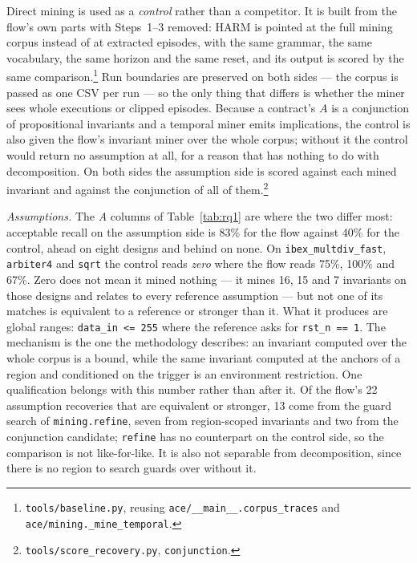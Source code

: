 Direct mining is used as a \emph{control} rather than a competitor. It is built from the flow's
own parts with Steps~1--3 removed: HARM is pointed at the full mining corpus instead of at
extracted episodes, with the same grammar, the same vocabulary, the same horizon and the same
reset, and its output is scored by the same
comparison.\footnote{\texttt{tools/baseline.py}, reusing \texttt{ace/\_\_main\_\_.corpus\_traces}
and \texttt{ace/mining.\_mine\_temporal}.} Run boundaries are preserved on both sides --- the
corpus is passed as one CSV per run --- so the only thing that differs is whether the miner
sees whole executions or clipped episodes. Because a contract's $A$ is a conjunction of
propositional invariants and a temporal miner emits implications, the control is also given the
flow's invariant miner over the whole corpus; without it the control would return no assumption
at all, for a reason that has nothing to do with decomposition. On both sides the assumption
side is scored against each mined invariant and against the conjunction of all of
them.\footnote{\texttt{tools/score\_recovery.py}, \texttt{conjunction}.}

\emph{Assumptions.} The \emph{A} columns of Table~\ref{tab:rq1} are where the two differ most:
acceptable recall on the assumption side is 83\% for the flow against 40\% for the control,
ahead on eight designs and behind on none. On \texttt{ibex\_multdiv\_fast}, \texttt{arbiter4}
and \texttt{sqrt} the control reads \emph{zero} where the flow reads 75\%, 100\% and 67\%. Zero
does not mean it mined nothing --- it mines 16, 15 and 7 invariants on those designs and
relates to every reference assumption --- but not one of its matches is equivalent to a
reference or stronger than it. What it produces are global ranges: \texttt{data\_in <= 255}
where the reference asks for \texttt{rst\_n == 1}. The mechanism is the one the methodology
describes: an invariant computed over the whole corpus is a bound, while the same invariant
computed at the anchors of a region and conditioned on the trigger is an environment
restriction. One qualification belongs with this number rather than after it. Of the flow's 22
assumption recoveries that are equivalent or stronger, 13 come from the guard search of
\texttt{mining.refine}, seven from region-scoped invariants and two from the conjunction
candidate; \texttt{refine} has no counterpart on the control side, so the comparison is not
like-for-like. It is also not separable from decomposition, since there is no region to search
guards over without it.

